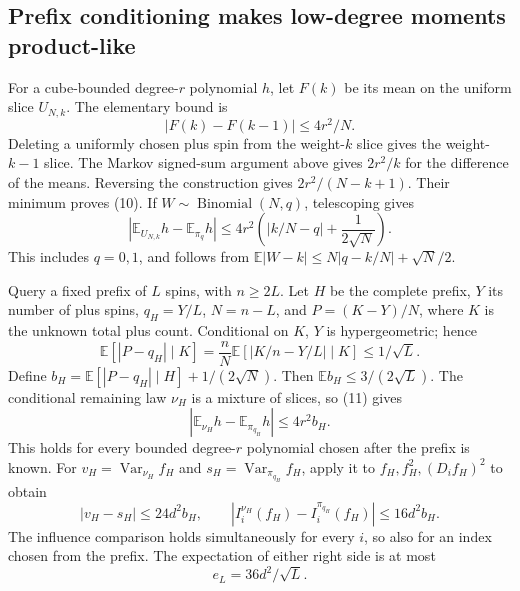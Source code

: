 \subsection{Prefix conditioning makes low-degree moments
product-like}\label{influence-recovery:prefix-conditioning-makes-low-degree-moments-product-like}

For a cube-bounded degree-\(r\) polynomial \(h\), let \(F(k)\) be its
mean on the uniform slice \(U_{N,k}\). The elementary bound is \[
 |F(k)-F(k-1)|\le4r^2/N.                                \tag{10}
\] Deleting a uniformly chosen plus spin from the weight-\(k\) slice
gives the weight-\(k-1\) slice. The Markov signed-sum argument above
gives \(2r^2/k\) for the difference of the means. Reversing the
construction gives \(2r^2/(N-k+1)\). Their minimum proves (10). If
\(W\sim\operatorname{Binomial}(N,q)\), telescoping gives \[
 |\mathbb E_{U_{N,k}}h-\mathbb E_{\pi_q}h|
 \le4r^2\left(|k/N-q|+\frac1{2\sqrt N}\right).            \tag{11}
\] This includes \(q=0,1\), and follows from
\(\mathbb E|W-k|\le N|q-k/N|+\sqrt N/2\).

Query a fixed prefix of \(L\) spins, with \(n\ge2L\). Let \(H\) be the
complete prefix, \(Y\) its number of plus spins, \(q_H=Y/L\), \(N=n-L\),
and \(P=(K-Y)/N\), where \(K\) is the unknown total plus count.
Conditional on \(K\), \(Y\) is hypergeometric; hence \[
 \mathbb E[|P-q_H|\mid K]
 =\frac nN\mathbb E[|K/n-Y/L|\mid K]\le1/\sqrt L.         \tag{12}
\] Define \(b_H=\mathbb E[|P-q_H|\mid H]+1/(2\sqrt N)\). Then
\(\mathbb E b_H\le3/(2\sqrt L)\). The conditional remaining law
\(\nu_H\) is a mixture of slices, so (11) gives \[
 |\mathbb E_{\nu_H}h-\mathbb E_{\pi_{q_H}}h|\le4r^2 b_H. \tag{13}
\] This holds for every bounded degree-\(r\) polynomial chosen after the
prefix is known. For \(v_H=\operatorname{Var}_{\nu_H}f_H\) and
\(s_H=\operatorname{Var}_{\pi_{q_H}}f_H\), apply it to
\(f_H,f_H^2,(D_i f_H)^2\) to obtain \[
 |v_H-s_H|\le24d^2b_H,\qquad
 |I_i^{\nu_H}(f_H)-I_i^{\pi_{q_H}}(f_H)|\le16d^2b_H.      \tag{14}
\] The influence comparison holds simultaneously for every \(i\), so
also for an index chosen from the prefix. The expectation of either
right side is at most \[
 e_L=36d^2/\sqrt L.                                     \tag{15}
\]
